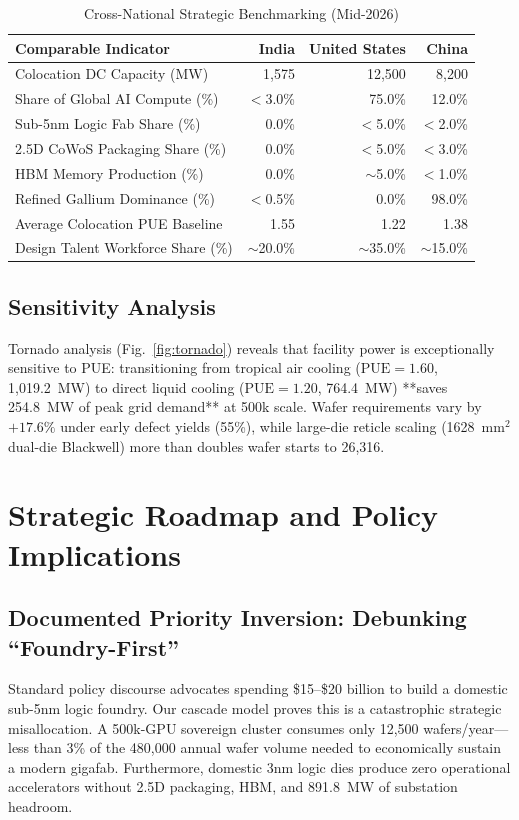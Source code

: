 \documentclass[conference]{IEEEtran}
\begin{document}
\begin{table}[t]
\caption{Cross-National Strategic Benchmarking (Mid-2026)}
\label{tab:country_matrix}
\centering
\scriptsize
\begin{tabular}{lrrr}
\toprule
\textbf{Comparable Indicator} & \textbf{India} & \textbf{United States} & \textbf{China} \\
\midrule
Colocation DC Capacity (MW) & 1,575 & 12,500 & 8,200 \\
Share of Global AI Compute (\%) & $<$3.0\% & 75.0\% & 12.0\% \\
Sub-5nm Logic Fab Share (\%) & 0.0\% & $<$5.0\% & $<$2.0\% \\
2.5D CoWoS Packaging Share (\%) & 0.0\% & $<$5.0\% & $<$3.0\% \\
HBM Memory Production (\%) & 0.0\% & $\sim$5.0\% & $<$1.0\% \\
Refined Gallium Dominance (\%) & $<$0.5\% & 0.0\% & 98.0\% \\
Average Colocation PUE Baseline & 1.55 & 1.22 & 1.38 \\
Design Talent Workforce Share (\%) & $\sim$20.0\% & $\sim$35.0\% & $\sim$15.0\% \\
\bottomrule
\end{tabular}
\end{table}

\subsection{Sensitivity Analysis}
Tornado analysis (Fig.~\ref{fig:tornado}) reveals that facility power is exceptionally sensitive to PUE: transitioning from tropical air cooling ($\text{PUE} = 1.60$, 1,019.2~MW) to direct liquid cooling ($\text{PUE} = 1.20$, 764.4~MW) **saves 254.8~MW of peak grid demand** at 500k scale. Wafer requirements vary by $+17.6\%$ under early defect yields (55\%), while large-die reticle scaling (1628~mm$^2$ dual-die Blackwell) more than doubles wafer starts to 26,316.

\section{Strategic Roadmap and Policy Implications}

\subsection{Documented Priority Inversion: Debunking ``Foundry-First''}
Standard policy discourse advocates spending \$15--\$20 billion to build a domestic sub-5nm logic foundry. Our cascade model proves this is a catastrophic strategic misallocation. A 500k-GPU sovereign cluster consumes only 12,500 wafers/year---less than 3\% of the 480,000 annual wafer volume needed to economically sustain a modern gigafab. Furthermore, domestic 3nm logic dies produce zero operational accelerators without 2.5D packaging, HBM, and 891.8~MW of substation headroom. 
\end{document}
